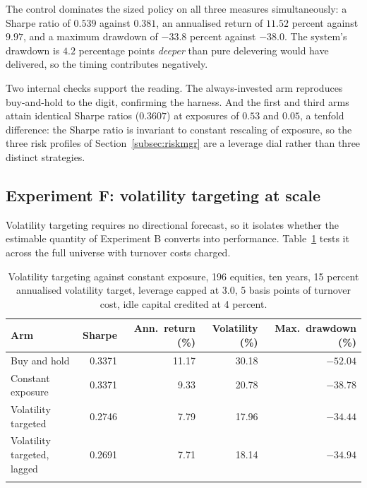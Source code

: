 \documentclass[pdflatex,sn-apa]{sn-jnl}%
\theoremstyle{thmstyleone}%
\theoremstyle{thmstyletwo}%
\theoremstyle{thmstylethree}%
\begin{document}
The control dominates the sized policy on all three measures simultaneously: a
Sharpe ratio of $0.539$ against $0.381$, an annualised return of $11.52$
percent against $9.97$, and a maximum drawdown of $-33.8$ percent against
$-38.0$. The system's drawdown is $4.2$ percentage points \emph{deeper} than
pure delevering would have delivered, so the timing contributes negatively.

Two internal checks support the reading. The always-invested arm reproduces
buy-and-hold to the digit, confirming the harness. And the first and third arms
attain identical Sharpe ratios ($0.3607$) at exposures of $0.53$ and $0.05$,
a tenfold difference: the Sharpe ratio is invariant to constant rescaling of
exposure, so the three risk profiles of Section~\ref{subsec:riskmgr} are a
leverage dial rather than three distinct strategies.

\subsection{Experiment F: volatility targeting at
scale}\label{subsec:eval-voltarget}

Volatility targeting requires no directional forecast, so it isolates whether
the estimable quantity of Experiment B converts into performance.
Table~\ref{tab:voltarget} tests it across the full universe with turnover costs
charged.

\begin{table}[h]
\caption{Volatility targeting against constant exposure, 196 equities, ten
years, 15 percent annualised volatility target, leverage capped at 3.0, 5 basis
points of turnover cost, idle capital credited at 4 percent.}\label{tab:voltarget}%
\begin{tabular*}{\textwidth}{@{\extracolsep\fill}lrrrr@{}}
\toprule
Arm & Sharpe & Ann.\ return (\%) & Volatility (\%) & Max.\ drawdown (\%) \\
\midrule
Buy and hold                & 0.3371 & 11.17 & 30.18 & $-52.04$ \\
Constant exposure           & 0.3371 &  9.33 & 20.78 & $-38.78$ \\
Volatility targeted         & 0.2746 &  7.79 & 17.96 & $-34.44$ \\
Volatility targeted, lagged & 0.2691 &  7.71 & 18.14 & $-34.94$ \\
\botrule
\end{tabular*}
\end{table}
\end{document}
